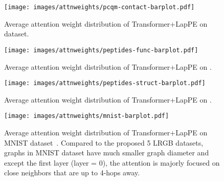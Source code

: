 \documentclass{article}
\begin{document}
\begin{figure}[ht]
    \centering
\texttt{[image: images/attnweights/pcqm-contact-barplot.pdf]}
\caption{Average attention weight distribution of Transformer+LapPE on \pcqmcontact dataset.}
\label{fig:attn-pcqmcontact}
\end{figure}


\begin{figure}[ht]
    \centering
\texttt{[image: images/attnweights/peptides-func-barplot.pdf]}
\caption{Average attention weight distribution of Transformer+LapPE on \pepfunc.}
\label{fig:attn-peptides-func}
\end{figure}


\begin{figure}[ht]
    \centering
\texttt{[image: images/attnweights/peptides-struct-barplot.pdf]}
\caption{Average attention weight distribution of Transformer+LapPE on \pepstruct.}
\label{fig:attn-peptides-struct}
\end{figure}

\begin{figure}[ht]
    \centering
\texttt{[image: images/attnweights/mnist-barplot.pdf]}
\caption{Average attention weight distribution of Transformer+LapPE on MNIST dataset~\cite{dwivedi2020benchmarking}. Compared to the proposed 5 LRGB datasets, graphs in MNIST dataset have much smaller graph diameter and except the first layer (layer = 0), the attention is majorly focused on close neighbors that are up to 4-hops away.}
\label{fig:attn-mnist}
\end{figure}
\end{document}
